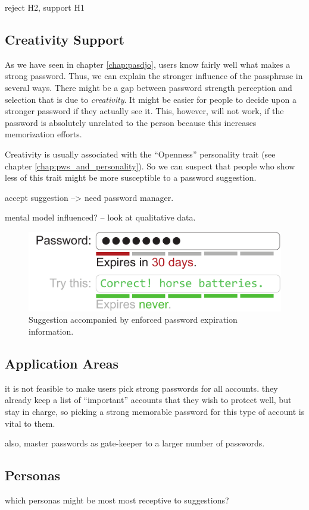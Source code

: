 reject H2, support H1

\subsection{Creativity Support}
As we have seen in chapter \ref{chap:pasdjo}, users know fairly well what makes a strong password. Thus, we can explain the stronger influence of the passphrase in several ways. There might be a gap between password strength perception and selection that is due to \textit{creativity}. It might be easier for people to decide upon a stronger password if they actually see it. This, however, will not work, if the password is absolutely unrelated to the person because this increases memorization efforts. 

Creativity is usually associated with the ``Openness'' personality trait (see chapter \ref{chap:pws_and_personality}). So we can suspect that people who show less of this trait might be more susceptible to a password suggestion. 

accept suggestion --> need password manager.

mental model influenced? -- look at qualitative data. 


\begin{figure}
	\centering
	\includegraphics[width=0.7\linewidth]{figures/decoy/expire_mockup}
	\caption{\label{fig:decoy:expiremockup}Suggestion accompanied by enforced password expiration information.}
\end{figure}


\subsection{Application Areas}
it is not feasible to make users pick strong passwords for all accounts.
they already keep a list of ``important'' accounts that they wish to protect well, but stay in charge, so picking a strong memorable password for this type of account is vital to them. 

also, master passwords as gate-keeper to a larger number of passwords. 

\subsection{Personas}
which personas might be most most receptive to suggestions?

